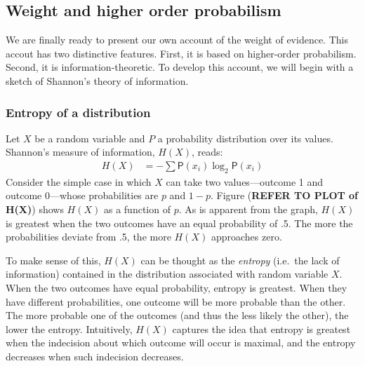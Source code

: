 \documentclass[
  10pt,
  dvipsnames,enabledeprecatedfontcommands]{scrartcl}
\begin{document}
\hypertarget{weight-and-higher-order-probabilism}{%
\subsection{Weight and higher order
probabilism}\label{weight-and-higher-order-probabilism}}

We are finally ready to present our own account of the weight of
evidence. This accout has two distinctive features. First, it is based
on higher-order probabilism. Second, it is information-theoretic. To
develop this account, we will begin with a sketch of Shannon's theory of
information.

\hypertarget{entropy-of-a-distribution}{%
\subsubsection{Entropy of a
distribution}\label{entropy-of-a-distribution}}

Let \(X\) be a random variable and \(P\) a probability distribution over
its values. Shannon's measure of information, \(H(X)\), reads:
\begin{align*}
H(X)  & =
- \sum \mathsf{P}(x_i) \log_2 \mathsf{P}(x_i)
\end{align*} \noindent  Consider the simple case in which \(X\) can take
two values---outcome 1 and outcome 0---whose probabilities are \(p\) and
\(1-p\). Figure (\textbf{REFER TO PLOT of H(X)}) shows \(H(X)\) as a
function of \(p\). As is apparent from the graph, \(H(X)\) is greatest
when the two outcomes have an equal probability of .5. The more the
probabilities deviate from .5, the more \(H(X)\) approaches zero.

To make sense of this, \(H(X)\) can be thought as the \textit{entropy}
(i.e.~the lack of information) contained in the distribution associated
with random variable \(X\). When the two outcomes have equal
probability, entropy is greatest. When they have different
probabilities, one outcome will be more probable than the other. The
more probable one of the outcomes (and thus the less likely the other),
the lower the entropy. Intuitively, \(H(X)\) captures the idea that
entropy is greatest when the indecision about which outcome will occur
is maximal, and the entropy decreases when such indecision decreases.
\end{document}
